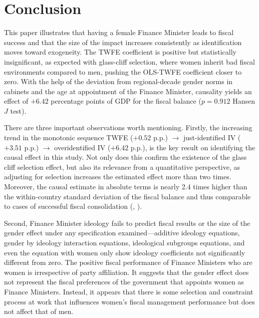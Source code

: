 \documentclass[12pt]{article}
\renewcommand{\citep}[1]{(\textit{\citeauthor{#1}}, \citeyear{#1})}
\begin{document}

\section{Conclusion}
\label{sec:conclusion}

This paper illustrates that having a female Finance Minister leads to 
fiscal success and that the size of the impact increases consistently 
as identification moves toward exogeneity. The TWFE coefficient is positive 
but statistically insignificant, as expected with glass-cliff selection, 
where women inherit bad fiscal environments compared to men, pushing the 
OLS-TWFE coefficient closer to zero. With the help of the deviation 
from regional-decade gender norms in cabinets and the age at appointment 
of the Finance Minister, causality yields an effect of $+6.42$ percentage 
points of GDP for the fiscal balance ($p = 0.912$ Hansen $J$ test).

There are three important observations worth mentioning. Firstly, the increasing trend in the monotonic sequence TWFE 
($+0.52$ p.p.) $\to$ just-identified IV ($+3.51$ p.p.) $\to$ overidentified 
IV ($+6.42$ p.p.), is the key result on identifying the causal effect 
in this study. Not only does this confirm the existence of the glass cliff 
selection effect, but also its relevance from a quantitative perspective, as 
adjusting for selection increases the estimated effect more than two times. 
Moreover, the causal estimate in absolute terms is nearly 2.4 times higher 
than the within-country standard deviation of the fiscal balance and thus 
comparable to cases of successful fiscal consolidation \citep{alesina2019}.

Second, Finance Minister ideology fails to predict fiscal results or 
the size of the gender effect under any specification examined---additive 
ideology equations, gender by ideology interaction equations, ideological 
subgroups equations, and even the equation with women only show ideology 
coefficients not significantly different from zero. The positive fiscal 
performance of Finance Ministers who are women is irrespective of party 
affiliation. It suggests that the gender effect does not represent the 
fiscal preferences of the government that appoints women as Finance Ministers. 
Instead, it appears that there is some selection and constraint process at 
work that influences women's fiscal management performance but does not affect 
that of men.
\end{document}
